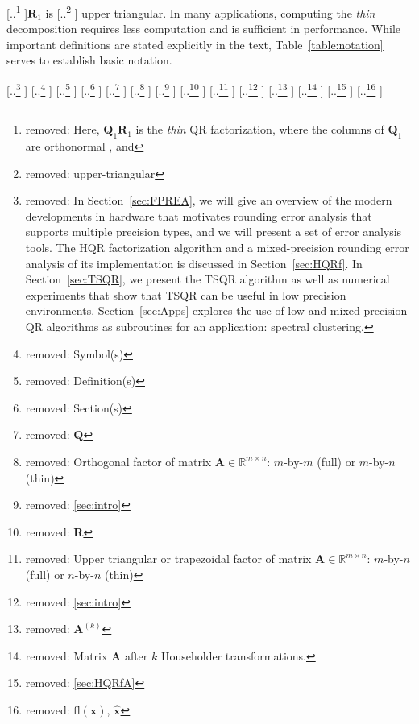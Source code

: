 \documentclass[review,onefignum,onetabnum]{siamart190516}
\newcommand{\R}{\mathbb{R}}
\newcommand{\bb}[1]{\mathbf{#1}}
\newcommand{\fl}{\mathrm{fl}}
\providecommand{\DIFadd}[1]{{\protect\color{blue} \sf #1}} %
\providecommand{\DIFdel}[1]{{\protect\color{red} [..\footnote{removed: #1} ]}} %
\providecommand{\DIFaddbegin}{} %
\providecommand{\DIFaddend}{} %
\providecommand{\DIFdelbegin}{} %
\providecommand{\DIFdelend}{} %
\providecommand{\DIFdelFL}[1]{\DIFdel{#1}} %
\begin{document}
\DIFdel{Here, $\bb{Q}_1\bb{R}_1$ is the \emph{thin} QR factorization, where the columns of $\bb{Q}_1$ are orthonormal
, and }\DIFdelend $\bb{R}_1$ is \DIFdelbegin \DIFdel{upper-triangular}\DIFdelend \DIFaddbegin \DIFadd{upper triangular}\DIFaddend .
In many applications, computing the \emph{thin} decomposition requires less computation and is sufficient in performance. 
While important definitions are stated explicitly in the text, Table~\ref{table:notation} serves to establish basic notation.
\DIFdelbegin %

\DIFdel{In Section~\ref{sec:FPREA}, we will give an overview of the modern developments in hardware that motivates rounding error analysis that supports multiple precision types, and we will present a set of error analysis tools. 
The HQR factorization algorithm and a mixed-precision rounding error analysis of its implementation is discussed in Section~\ref{sec:HQRf}.
In Section~\ref{sec:TSQR}, we present the TSQR algorithm as well as numerical experiments that show that TSQR can be useful in low precision environments. Section~\ref{sec:Apps} explores the use of low and mixed precision QR algorithms as subroutines for an application: spectral clustering. 
}%
		\DIFdelFL{Symbol(s) }%
\DIFdelFL{Definition(s) }%
\DIFdelFL{Section(s) }%
\DIFdelFL{$\bb{Q}$  }%
\DIFdelFL{Orthogonal factor of matrix $\bb{A}\in\R^{m\times n}$: $m$-by-$m$ (full) or $m$-by-$n$ (thin)  }%
\DIFdelFL{\ref{sec:intro}}%
\DIFdelFL{$\bb{R}$ }%
\DIFdelFL{Upper triangular or trapezoidal factor of matrix $\bb{A}\in\R^{m\times n}$:  $m$-by-$n$ (full) or $n$-by-$n$ (thin)  }%
\DIFdelFL{\ref{sec:intro}}%
\DIFdelFL{$\bb{A}^{(k)}$ }%
\DIFdelFL{Matrix $\bb{A}$ after $k$ Householder transformations. }%
\DIFdelFL{\ref{sec:HQRfA}}%
\DIFdelFL{$\fl(\bb{x})$, $\hat{\bb{x}}$ }%
\end{document}
